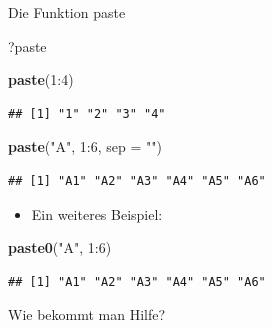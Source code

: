 \documentclass[ignorenonframetext,]{beamer}
\newenvironment{Shaded}{}{}
\newcommand{\KeywordTok}[1]{\textcolor[rgb]{0.00,0.44,0.13}{\textbf{{#1}}}}
\newcommand{\DataTypeTok}[1]{\textcolor[rgb]{0.56,0.13,0.00}{{#1}}}
\newcommand{\DecValTok}[1]{\textcolor[rgb]{0.25,0.63,0.44}{{#1}}}
\newcommand{\StringTok}[1]{\textcolor[rgb]{0.25,0.44,0.63}{{#1}}}
\newcommand{\NormalTok}[1]{{#1}}
\providecommand{\tightlist}{%
\setlength{\itemsep}{0pt}\setlength{\parskip}{0pt}}
\begin{document}
\begin{frame}[fragile]{Die Funktion paste}

\begin{Shaded}
\begin{Highlighting}[]
\NormalTok{?paste}
\end{Highlighting}
\end{Shaded}

\begin{Shaded}
\begin{Highlighting}[]
\KeywordTok{paste}\NormalTok{(}\DecValTok{1}\NormalTok{:}\DecValTok{4}\NormalTok{)}
\end{Highlighting}
\end{Shaded}

\begin{verbatim}
## [1] "1" "2" "3" "4"
\end{verbatim}

\begin{Shaded}
\begin{Highlighting}[]
\KeywordTok{paste}\NormalTok{(}\StringTok{"A"}\NormalTok{, }\DecValTok{1}\NormalTok{:}\DecValTok{6}\NormalTok{, }\DataTypeTok{sep =} \StringTok{""}\NormalTok{)}
\end{Highlighting}
\end{Shaded}

\begin{verbatim}
## [1] "A1" "A2" "A3" "A4" "A5" "A6"
\end{verbatim}

\begin{itemize}
\tightlist
\item
  Ein weiteres Beispiel:
\end{itemize}

\begin{Shaded}
\begin{Highlighting}[]
\KeywordTok{paste0}\NormalTok{(}\StringTok{"A"}\NormalTok{, }\DecValTok{1}\NormalTok{:}\DecValTok{6}\NormalTok{)}
\end{Highlighting}
\end{Shaded}

\begin{verbatim}
## [1] "A1" "A2" "A3" "A4" "A5" "A6"
\end{verbatim}

\end{frame}

\begin{frame}{Wie bekommt man Hilfe?}

\end{frame}
\end{document}
